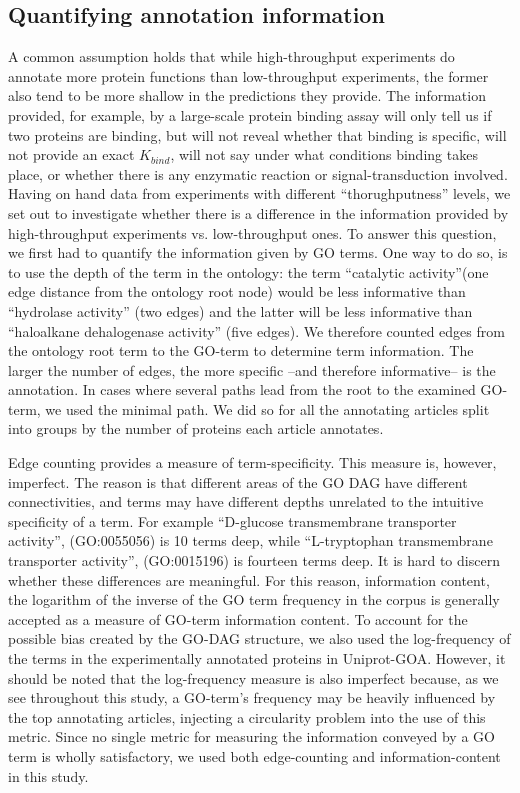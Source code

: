 \documentclass[12pt]{article}
\begin{document}
\subsection*{Quantifying annotation information}

A common assumption holds that while high-throughput experiments do annotate more
protein functions than low-throughput experiments, the former also tend to be more
shallow in the predictions they provide. The information provided, for example, by a
large-scale protein binding assay will only tell us if two proteins are binding, but
will not reveal whether that binding is specific, will not provide an exact
$K_{bind}$, will not say under what conditions binding takes place, or whether there
is any enzymatic reaction or signal-transduction involved. Having on hand data from
experiments with different ``thorughputness'' levels,  we set out to investigate
whether there is a difference in the information provided by high-throughput
experiments vs. low-throughput ones. To answer this question, we first had to
quantify the information given by GO terms. One way to do so, is to use the depth of
the term in the ontology: the term ``catalytic activity''(one edge distance from the
ontology root node) would be less informative than ``hydrolase activity'' (two
edges) and the latter will be less informative than ``haloalkane dehalogenase
activity'' (five edges).  We
therefore counted edges from the ontology root term to the GO-term to determine term
information. The larger the number of edges, the more specific --and therefore
informative-- is the annotation. In cases where several paths lead from the root to
the examined GO-term, we used the minimal path. We did so for all the annotating
articles split into groups by the number of proteins each article annotates. 

Edge counting provides a measure of term-specificity. This measure is, however,
imperfect. The reason is that different areas of the GO DAG have different
connectivities, and terms may have different depths unrelated to the intuitive
specificity of a term. For example ``D-glucose transmembrane transporter activity'',
(GO:0055056) is 10 terms deep, while ``L-tryptophan transmembrane transporter
activity'', (GO:0015196) is fourteen
terms deep. It is hard to discern whether these differences are meaningful. 
For this reason, information content, the logarithm of the inverse of
the GO term frequency in the corpus is generally accepted as a measure of GO-term
information content\cite{Lord2003Investigating,Pesquita2009Semantic}. To account for the possible bias created by
the GO-DAG structure, we also used the log-frequency of the terms in the
experimentally annotated proteins in Uniprot-GOA.  However, it should be noted that
the log-frequency measure is also imperfect because, as we see throughout this
study, a GO-term's frequency may be heavily influenced  by the top annotating
articles, injecting a circularity problem into the use of this metric. Since no
single metric for measuring the information conveyed by a GO term is wholly
satisfactory, we used both edge-counting and information-content in this study.
\end{document}
